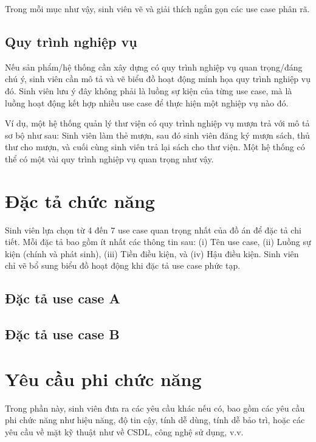 \documentclass[../DoAn.tex]{subfiles}
\begin{document}
Trong mỗi mục như vậy, sinh viên vẽ và giải thích ngắn gọn các use case phân rã.

\subsection{Quy trình nghiệp vụ}
\label{subsection:2.2.3}
Nếu sản phẩm/hệ thống cần xây dựng có quy trình nghiệp vụ quan trọng/đáng chú ý, sinh viên cần mô tả và vẽ biểu đồ hoạt động minh họa quy trình nghiệp vụ đó. Sinh viên lưu ý đây không phải là luồng sự kiện của từng use case, mà là luồng hoạt động kết hợp nhiều use case để thực hiện một nghiệp vụ nào đó.

Ví dụ, một hệ thống quản lý thư viện có quy trình nghiệp vụ mượn trả với mô tả sơ bộ như sau: Sinh viên làm thẻ mượn, sau đó sinh viên đăng ký mượn sách, thủ thư cho mượn, và cuối cùng sinh viên trả lại sách cho thư viện. Một hệ thống có thể có một vài quy trình nghiệp vụ quan trọng như vậy.
\section{Đặc tả chức năng}
\label{section:2.3}
Sinh viên lựa chọn từ 4 đến 7 use case quan trọng nhất của đồ án để đặc tả chi tiết. Mỗi đặc tả bao gồm ít nhất các thông tin sau: (i) Tên use case, (ii) Luồng sự kiện (chính và phát sinh), (iii) Tiền điều kiện, và (iv) Hậu điều kiện. Sinh viên chỉ vẽ bổ sung biểu đồ hoạt động khi đặc tả use case phức tạp.
\subsection{Đặc tả use case A}
\hfill
\subsection{Đặc tả use case B}
\hfill

\section{Yêu cầu phi chức năng}
\label{section:2.4}
Trong phần này, sinh viên đưa ra các yêu cầu khác nếu có, bao gồm các yêu cầu phi chức năng như hiệu năng, độ tin cậy, tính dễ dùng, tính dễ bảo trì, hoặc các yêu cầu về mặt kỹ thuật như về CSDL, công nghệ sử dụng, v.v.
\end{document}
